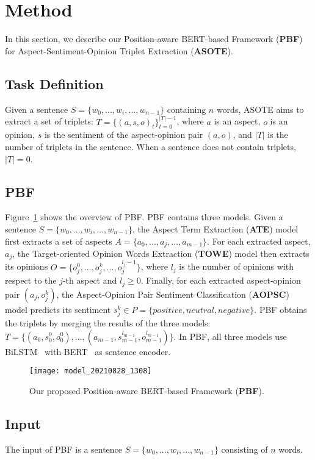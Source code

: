 \documentclass[11pt]{article}
\begin{document}
\section{Method}
In this section, we describe our Position-aware BERT-based Framework (\textbf{PBF}) for Aspect-Sentiment-Opinion Triplet Extraction (\textbf{ASOTE}). 

\subsection{Task Definition}
Given a sentence $S=\{w_0,...,w_i,...,w_{n-1}\}$ containing $n$ words, ASOTE aims to extract a set of triplets: $T=\{(a, s, o)_t\}_{t=0}^{|T|-1}$, where $a$ is an aspect, $o$ is an opinion, $s$ is the sentiment of the aspect-opinion pair $(a, o)$, and $|T|$ is the number of triplets in the sentence. When a sentence does not contain triplets,  $|T| = 0$.

\subsection{PBF}
Figure~\ref{fig:PBF} shows the overview of PBF. PBF contains three models. Given a sentence $S=\{w_0,...,w_i,...,w_{n-1}\}$, the Aspect Term Extraction (\textbf{ATE}) model first extracts a set of aspects $A=\{a_0,...,a_j,...,a_{m-1}\}$. For each extracted aspect, $a_j$, the Target-oriented Opinion Words Extraction (\textbf{TOWE}) model then extracts its opinions $O=\{o_j^0,...,o_j^k,..., o_j^{{l_j}-1}\}$, where $l_j$ is the number of opinions with respect to the $j$-th aspect and $l_j \ge 0$. Finally, for each extracted aspect-opinion pair $(a_j, o_j^k)$, the Aspect-Opinion Pair Sentiment Classification (\textbf{AOPSC}) model predicts its sentiment  $s_j^k \in P = \{positive, neutral, negative\}$. PBF obtains the triplets by merging the results of the three models: $T=\{(a_0, s_0^0, o_0^0),..., (a_{m-1}, s_{m-1}^{l_{m-1}}, o_{m-1}^{l_{m-1}})\}$. In PBF, all three models use BiLSTM~\citep{graves2013speech} with BERT~\citep{devlin2019bert} as sentence encoder.

\begin{figure}
	\centering
	\texttt{[image: model\_20210828\_1308]}
	\caption{Our proposed Position-aware BERT-based Framework (\textbf{PBF}).}
	\label{fig:PBF}
\end{figure}

\subsection{Input}
The input of PBF is a sentence $S=\{w_0,...,w_i,...,w_{n-1}\}$ consisting of $n$ words.
\end{document}
